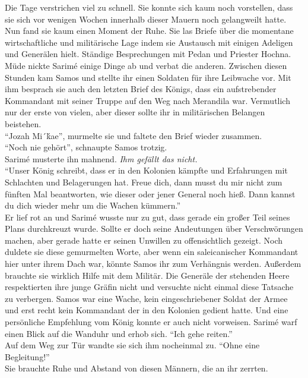 Die Tage verstrichen viel zu schnell. Sie konnte sich kaum noch vorstellen, dass sie sich vor 
wenigen Wochen innerhalb dieser Mauern noch gelangweilt hatte. Nun fand sie kaum einen Moment der 
Ruhe. Sie las Briefe über die momentane wirtschaftliche und militärische Lage indem sie  
Austausch mit einigen Adeligen und Generälen hielt. Ständige Besprechungen mit Pedan und 
Priester Hochna. Müde nickte Sarimé einige Dinge ab und verbat die anderen. Zwischen diesen Stunden 
kam Samos und stellte ihr einen Soldaten für ihre Leibwache vor. Mit ihm besprach sie auch den 
letzten Brief des Königs, dass ein aufstrebender Kommandant mit seiner Truppe auf den Weg nach 
Merandila war. Vermutlich nur der erste von vielen, aber dieser sollte ihr in militärischen Belangen 
beistehen. \\
``Jozah Mi´ḱae'', murmelte sie und faltete den Brief wieder zusammen.\\
``Noch nie gehört'', schnaupte Samos trotzig.\\
Sarimé musterte ihn mahnend. \textit{Ihm gefällt das nicht.}\\
``Unser König schreibt, dass er in den Kolonien kämpfte und Erfahrungen mit Schlachten und 
Belagerungen hat. Freue dich, dann musst du mir nicht zum fünften Mal beantworten, wie dieser oder 
jener General noch hieß. Dann kannst du dich wieder mehr um die Wachen kümmern.''\\
Er lief rot an und Sarimé wusste nur zu gut, dass gerade ein großer Teil seines Plans durchkreuzt 
wurde. Sollte er doch seine Andeutungen über Verschwörungen machen, aber gerade hatte er seinen 
Unwillen zu offensichtlich gezeigt. Noch duldete sie diese gemurmelten Worte, aber wenn ein 
saleicanischer Kommandant hier unter ihrem Dach war, könnte Samos ihr zum Verhängnis werden. 
Außerdem brauchte sie wirklich Hilfe mit dem Militär. Die Generäle der stehenden Heere respektierten 
ihre junge Gräfin nicht und versuchte nicht einmal diese Tatsache zu verbergen. Samos war eine 
Wache, kein eingeschriebener Soldat der Armee und erst recht kein Kommandant der in den Kolonien 
gedient hatte. Und eine persönliche Empfehlung vom König konnte er auch nicht vorweisen. Sarimé warf 
einen Blick auf die Wanduhr und erhob sich. ``Ich gehe reiten.''\\
Auf dem Weg zur Tür wandte sie sich ihm nocheinmal zu. ``Ohne eine Begleitung!''\\
Sie brauchte Ruhe und Abstand von diesen Männern, die an ihr zerrten. \\

